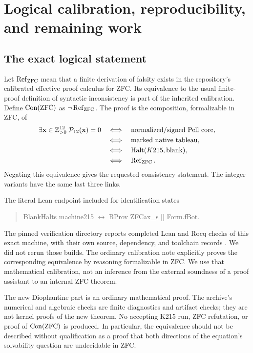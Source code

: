 \section{Logical calibration, reproducibility, and remaining work}
\label{sec:verification}

\subsection{The exact logical statement}

Let $\operatorname{Ref}_{\rm ZFC}$ mean that a finite derivation of
falsity exists in the repository's calibrated effective proof calculus
for ZFC.  Its equivalence to the usual finite-proof definition of
syntactic inconsistency is part of the inherited calibration.
Define $\operatorname{Con}(\mathrm{ZFC})$ as $\neg\operatorname{Ref}_{\rm ZFC}$.
The proof is the composition, formalizable in ZFC, of
\begin{align*}
\exists\mathbf x\in\mathbb Z_{>0}^{12}\;\mathcal P_{12}(\mathbf x)=0
&\quad\Longleftrightarrow\quad\text{normalized/signed Pell core},\\
&\quad\Longleftrightarrow\quad\text{marked native tableau},\\
&\quad\Longleftrightarrow\quad\operatorname{Halt}(K215,\mathrm{blank}),\\
&\quad\Longleftrightarrow\quad\operatorname{Ref}_{\rm ZFC}.
\end{align*}
Negating this equivalence gives the requested consistency statement.
The integer variants have the same last three links.

The literal Lean endpoint included for identification states
\begin{quote}\small\ttfamily
BlankHalts machine215 $\leftrightarrow$ BProv ZFCax\_s [] Form.fBot.
\end{quote}
The pinned verification directory reports completed Lean and Rocq
checks of this exact machine, with their own source, dependency, and
toolchain records \cite{RepoK215}.  We did not rerun those builds.
The ordinary calibration note explicitly proves the corresponding
equivalence by reasoning formalizable in ZFC.  We use that mathematical
calibration, not an inference from the external soundness of a proof
assistant to an internal ZFC theorem.

The new Diophantine part is an ordinary mathematical proof.  The
archive's numerical and algebraic checks are finite diagnostics and
artifact checks; they are not kernel proofs of the new theorem.
No accepting K215 run, ZFC refutation, or proof of $\operatorname{Con}(\mathrm{ZFC})$
is produced.  In particular, the equivalence should not be described
without qualification as a proof that both directions of the equation's
solvability question are undecidable in ZFC.

